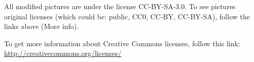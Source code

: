 \documentclass{imgBook}
\begin{document}
\begin{element}
\end{element}




\backmatter

{\scriptsize \authorsthanks}

All modified pictures are under the license CC-BY-SA-3.0. 
To see pictures original licenses (which could be: public, CC0, CC-BY, CC-BY-SA), follow the links above (More info).

To get more information about Creative Commons licenses, follow this link: \url{http://creativecommons.org/licenses/}


\end{document}

